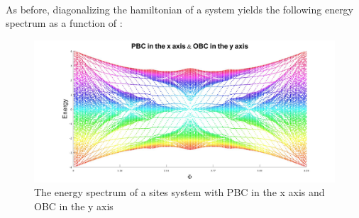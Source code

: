\documentclass[11pt,fleqn]{article}
\begin{document}
\paragraph{}
As before, diagonalizing the hamiltonian of a \endmath\space system yields the following energy spectrum as a function of \math{\Phi} \endmath:

\begin{figure}[htp!]
\centerline
    {\includegraphics[scale=0.25]{2.jpg}}
    \caption{The energy spectrum of a \endmath\space sites system with PBC in the x axis and OBC in the y axis}
\end{figure}
\end{document}
